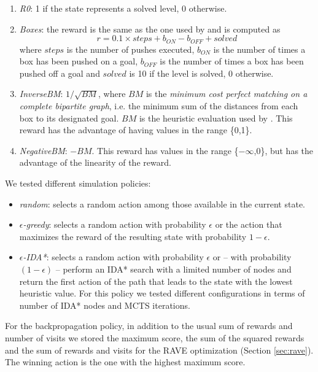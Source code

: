 \begin{enumerate}
    \item \textit{R0}: 1 if the state represents a solved level, 0 otherwise.
    \item \textit{Boxes}: the reward is the same as the one used by \cite{DBLP:journals/corr/WeberRRBGRBVHLP17} and is computed as
    \begin{equation}
        r = 0.1\times steps + b_{ON} - b_{OFF} + solved 
    \end{equation}where $steps$ is the number of pushes executed, $b_{ON}$ is the number of times a box has been pushed on a goal, $b_{OFF}$ is the number of times a box has been pushed off a goal and $solved$ is 10 if the level is solved, 0 otherwise.
    \item \textit{InverseBM}: $1/\sqrt{BM}$, where $BM$ is the \textit{minimum cost perfect matching on a complete bipartite graph}, i.e. the minimum sum of the distances from each box to its designated goal. $BM$ is the heuristic evaluation used by \cite{Junghanns99pushingthe}. This reward has the advantage of having values in the range \{0,1\}.
    \item \textit{NegativeBM}: $-BM$. This reward has values in the range \{$-\infty$,0\}, but has the advantage of the linearity of the reward.
\end{enumerate}

\medskip\noindent
We tested different simulation policies:
\begin{itemize}
    \item \textit{random}: selects a random action among those available in the current state.
    \item \textit{$\epsilon$-greedy}: selects a random action with probability $\epsilon$ or the action that maximizes the reward of the resulting state with probability $1-\epsilon$.
    \item \textit{$\epsilon$-IDA*}: selects a random action with probability $\epsilon$ or -- with probability $(1-\epsilon)$ -- perform an IDA* search with a limited number of nodes and return the first action of the path that leads to the state with the lowest heuristic value. For this policy we tested different configurations in terms of number of IDA* nodes and MCTS iterations.
\end{itemize}
For the backpropagation policy, in addition to the usual sum of rewards and number of visits we stored the maximum score, the sum of the squared rewards and the sum of rewards and visits for the RAVE optimization (Section \ref{sec:rave}). The winning action is the one with the highest maximum score.

